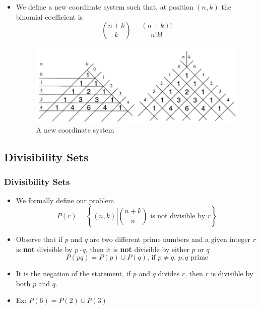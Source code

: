 \documentclass{beamer}
\begin{document}
\begin{frame}
    \begin{itemize}
        \item We define a new coordinate system such that, at position $(n,k)$ the binomial coefficient is 
        \begin{equation*}
            \binom{n+k}{k} = \frac{(n+k)!}{n!k!}
        \end{equation*}
        \begin{figure}
            \centering
            \includegraphics[scale=0.39]{newCoordinate.png}
            \caption{A new coordinate system}
        \end{figure}
    \end{itemize}
\end{frame}

\subsection{Divisibility Sets}
\begin{frame}
    \frametitle{Divisibility Sets}
    \begin{itemize}
        \item We formally define our problem
        \begin{equation*}
            P(r) = \left\{ (n,k) \left| \binom{n+k}{n} \text{ is not divisible by }r \right. \right\}
        \end{equation*}
        \item Observe that if $p$ and $q$ are two different prime numbers and a given integer $r$ is \textbf{not} divisible by $p \cdot q$, then it is \textbf{not} divisible by either $p$ or $q$
        \begin{equation*}
            P(pq) = P(p) \cup P(q) \text{, if $p \neq q$, $p,q$ prime}
        \end{equation*}
        \item It is the negation of the statement, if $p$ and $q$ divides $r$, then $r$ is divisible by both $p$ and $q$.
        \item Ex: $P(6) = P(2) \cup P(3)$ %
    \end{itemize}
\end{frame}
\end{document}
